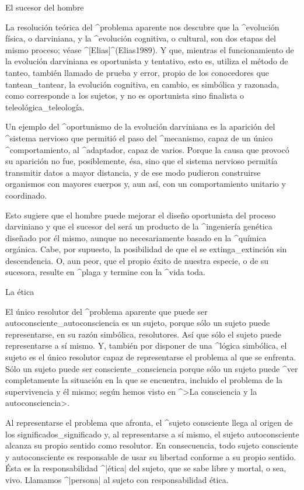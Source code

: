 \Section El sucesor del hombre

La resolución teórica del ^{problema aparente} nos descubre que la
^{evolución física}, o darviniana, y la ^{evolución cognitiva}, o
cultural, son dos etapas del mismo proceso; véase ^[Elias]^(Elias1989).
Y que, mientras el funcionamiento de la evolución darviniana es
oportunista y tentativo, esto es, utiliza el método de tanteo, también
llamado de prueba y error, propio de los conocedores que
tantean_{tantear}, la evolución cognitiva, en cambio, es simbólica y
razonada, como corresponde a los sujetos, y no es oportunista sino
finalista o teleológica_{teleología}.

Un ejemplo del ^{oportunismo} de la evolución darviniana es la aparición
del ^{sistema nervioso} que permitió el paso del ^{mecanismo}, capaz de
un único ^{comportamiento}, al ^{adaptador}, capaz de varios. Porque la
causa que provocó su aparición no fue, posiblemente, ésa, sino que el
sistema nervioso permitía transmitir datos a mayor distancia, y de ese
modo pudieron construirse organismos con mayores cuerpos y, aun así, con
un comportamiento unitario y coordinado.

Esto sugiere que el hombre puede mejorar el diseño oportunista del
proceso darviniano y que el sucesor del  será un
producto de la ^{ingeniería} genética diseñado por él mismo, aunque no
necesariamente basado en la ^{química orgánica}. Cabe, por supuesto, la
posibilidad de que el  se extinga_{extinción} sin
descendencia. O, aun peor, que el propio éxito de nuestra especie, o de
su sucesora, resulte en ^{plaga} y termine con la ^{vida} toda.


\Section La ética

El único resolutor del ^{problema aparente} que puede ser
autoconsciente_{autoconsciencia} es un sujeto, porque sólo un sujeto
puede representarse, en su razón simbólica, resolutores. Así que sólo el
sujeto puede representarse a sí mismo. Y, también por disponer de una
^{lógica simbólica}, el sujeto es el único resolutor capaz de
representarse el problema al que se enfrenta. Sólo un sujeto puede ser
consciente_{consciencia} porque sólo un sujeto puede ^{ver}
completamente la situación en la que se encuentra, incluido el problema
de la supervivencia y él mismo; según hemos visto en ^>La consciencia y
la autoconsciencia>.

Al representarse el problema que afronta, el ^{sujeto} consciente llega
al origen de los significados_{significado} y, al representarse a sí
mismo, el sujeto autoconsciente alcanza su propio sentido como
resolutor. En consecuencia, todo sujeto consciente y autoconsciente es
responsable de usar su libertad conforme a su propio sentido. Ésta es la
responsabilidad ^|ética| del sujeto, que se sabe libre y mortal, o sea,
vivo. Llamamos ^|persona| al sujeto con responsabilidad ética.

